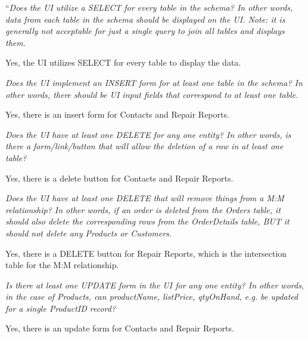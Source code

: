 \documentclass{article}
\begin{document}
\begin{tcolorbox}[colback=secondarycolor, colframe=primarycolor, title=\textbf{Step 3: Peer Review 3 - Fidella Wu}]
``\textit{Does the UI utilize a SELECT for every table in the schema? In other words, data from each table in the schema should be displayed on the UI. Note: it is generally not acceptable for just a single query to join all tables and displays them.}

\vspace{0.05cm}
Yes, the UI utilizes SELECT for every table to display the data.

\vspace{0.2cm}
\textit{Does the UI implement an INSERT form for at least one table in the schema? In other words, there should be UI input fields that correspond to at least one table.}

\vspace{0.05cm}
Yes, there is an insert form for Contacts and Repair Reports.

\vspace{0.2cm}
\textit{Does the UI have at least one DELETE for any one entity? In other words, is there a form/link/button that will allow the deletion of a row in at least one table?}

\vspace{0.05cm}
Yes, there is a delete button for Contacts and Repair Reports.

\vspace{0.2cm}
\textit{Does the UI have at least one DELETE that will remove things from a M:M relationship? In other words, if an order is deleted from the Orders table, it should also delete the corresponding rows from the OrderDetails table, BUT it should not delete any Products or Customers.}

\vspace{0.05cm}
Yes, there is a DELETE button for Repair Reports, which is the intersection table for the M:M relationship.

\vspace{0.2cm}
\textit{Is there at least one UPDATE form in the UI for any one entity? In other words, in the case of Products, can productName, listPrice, qtyOnHand, e.g. be updated for a single ProductID record?}

\vspace{0.05cm}
Yes, there is an update form for Contacts and Repair Reports.


\end{tcolorbox}
\end{document}
